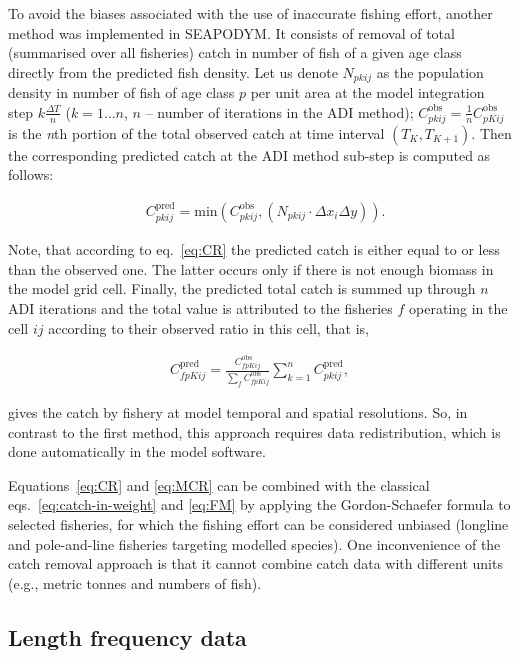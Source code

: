 To avoid the biases associated with the use of inaccurate fishing effort, another method was implemented in SEAPODYM. It consists of removal of total (summarised over all fisheries) catch in number of fish of a given age class directly from the predicted fish density. Let us denote $N_{pkij}$ as the population density in number of fish of age class $p$ per unit area at the model integration step $k\frac{\Delta T}{n}$ ($k=1\dots n$, $n$ -- number of iterations in the ADI method); $C^{\text{obs}}_{pkij}=\frac{1}{n}C^{\text{obs}}_{pKij}$ is the \textit{n}th portion of the total observed catch at time interval $(T_K, T_{K+1})$. Then the corresponding predicted catch at the ADI method sub-step is computed as follows:

\begin{align}
&C^{\text{pred}}_{pkij} = \text{min}\left(C_{pkij}^{\text{obs}}, (N_{pkij} \cdot \scriptstyle{\Delta} x_i \scriptstyle{\Delta} y) \right).
\label{eq:CR}
\end{align}

Note, that according to eq.~\ref{eq:CR} the predicted catch is either equal to or less than the observed one. The latter occurs only if there is not enough biomass in the model grid cell. Finally, the predicted total catch is summed up through $n$ ADI iterations and the total value is attributed to the fisheries $f$ operating in the cell $ij$ according to their observed ratio in this cell, that is,

\begin{align*}
C^{\text{pred}}_{fpKij} = \frac{C^{\text{obs}}_{fpKij}}{\sum_f C^{\text{obs}}_{fpKij}} \sum_{k=1}^n C^{\text{pred}}_{pkij},
\label{eq:CR-catch-at-age}
\end{align*} 

\noindent gives the catch by fishery at model temporal and spatial resolutions. So, in contrast to the first method, this approach requires data redistribution, which is done automatically in the model software.

Equations~\ref{eq:CR} and \ref{eq:MCR} can be combined with the classical eqs.~\ref{eq:catch-in-weight} and \ref{eq:FM} by applying the Gordon-Schaefer formula to selected fisheries, for which the fishing effort can be considered unbiased (longline and pole-and-line fisheries targeting modelled species). One inconvenience of the catch removal approach is that it cannot combine catch data with different units (e.g., metric tonnes and numbers of fish).  

\subsection{Length frequency data}\label{sec:integrating-lf}

